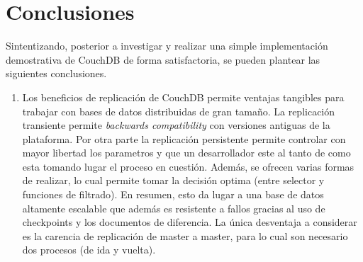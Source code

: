 \documentclass{article}
\begin{document}
    \section{Conclusiones}
        Sintentizando, posterior a investigar y realizar una simple implementación demostrativa de CouchDB de forma satisfactoria, se pueden plantear las siguientes conclusiones.
        \begin{enumerate}
            \item Los beneficios de replicación de CouchDB permite ventajas tangibles para trabajar con bases de datos distribuidas de gran tamaño. La replicación transiente permite \textit{backwards compatibility} con versiones antiguas de la plataforma. Por otra parte la replicación persistente permite controlar con mayor libertad los parametros y que un desarrollador este al tanto de como esta tomando lugar el proceso en cuestión. Además, se ofrecen varias formas de realizar, lo cual permite tomar la decisión optima (entre selector y funciones de filtrado). En resumen, esto da lugar a una base de datos altamente escalable que además es resistente a fallos gracias al uso de checkpoints y los documentos de diferencia. La única desventaja a considerar es la carencia de replicación de master a master, para lo cual son necesario dos procesos (de ida y vuelta).
        \end{enumerate}
    \newpage

    
    
\end{document}

